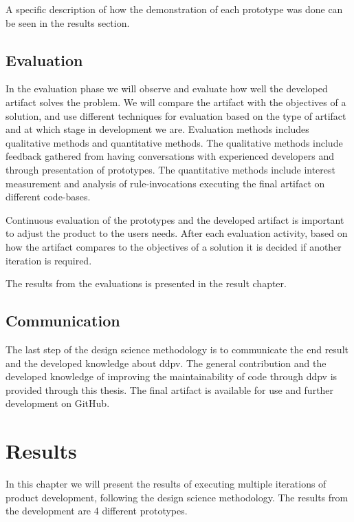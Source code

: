 \documentclass{report}
\begin{document}
A specific description of how the demonstration of each prototype was done can be seen in the results section.

 
\section{Evaluation}
In the evaluation phase we will observe and evaluate how well the developed artifact solves the problem. We will compare the artifact with the objectives of a solution, and use different techniques for evaluation based on the type of artifact and at which stage in development we are. Evaluation methods includes qualitative methods and quantitative methods. The qualitative methods include feedback gathered from having conversations with experienced developers and through presentation of prototypes. The quantitative methods include interest measurement and analysis of rule-invocations executing the final artifact on different code-bases.  

Continuous evaluation of the prototypes and the developed artifact is important to adjust the product to the users needs. After each evaluation activity, based on how the artifact compares to the objectives of a solution it is decided if another iteration is required.

The results from the evaluations is presented in the result chapter.

\section{Communication}
The last step of the design science methodology is to communicate the end result and the developed knowledge about \gls{ddpv}. The general contribution and the developed knowledge of improving the maintainability of code through \gls{ddpv} is provided through this thesis. The final artifact is available for use and further development on GitHub\cite{detekt-hint-repository}.

\chapter{Results}
\label{results}

In this chapter we will present the results of executing multiple iterations of product development, following the design science methodology. The results from the development are 4 different prototypes.
\end{document}
